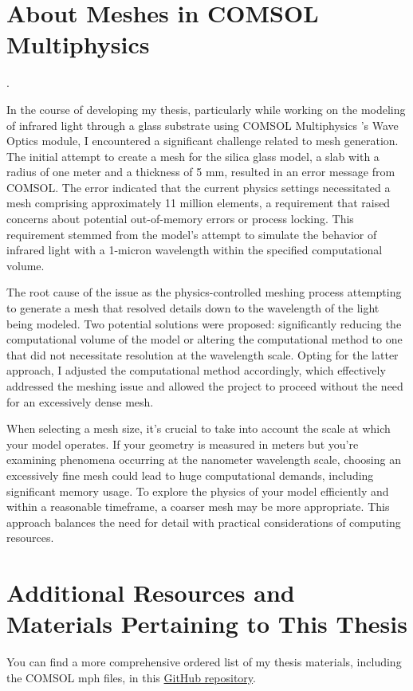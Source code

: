 \section{About Meshes in COMSOL Multiphysics}.

In the course of developing my thesis, particularly while working on the modeling of infrared light through a glass substrate using COMSOL Multiphysics \texttrademark's Wave Optics module, I encountered a significant challenge related to mesh generation. The initial attempt to create a mesh for the silica glass model, a slab with a radius of one meter and a thickness of 5 mm, resulted in an error message from COMSOL. The error indicated that the current physics settings necessitated a mesh comprising approximately 11 million elements, a requirement that raised concerns about potential out-of-memory errors or process locking. This requirement stemmed from the model's attempt to simulate the behavior of infrared light with a 1-micron wavelength within the specified computational volume.

The root cause of the issue as the physics-controlled meshing process attempting to generate a mesh that resolved details down to the wavelength of the light being modeled. Two potential solutions were proposed: significantly reducing the computational volume of the model or altering the computational method to one that did not necessitate resolution at the wavelength scale. Opting for the latter approach, I adjusted the computational method accordingly, which effectively addressed the meshing issue and allowed the project to proceed without the need for an excessively dense mesh.

When selecting a mesh size, it's crucial to take into account the scale at which your model operates. If your geometry is measured in meters but you're examining phenomena occurring at the nanometer wavelength scale, choosing an excessively fine mesh could lead to huge computational demands, including significant memory usage. To explore the physics of your model efficiently and within a reasonable timeframe, a coarser mesh may be more appropriate. This approach balances the need for detail with practical considerations of computing resources.

\section{Additional Resources and Materials Pertaining to This Thesis}

You can find a more comprehensive ordered list of my thesis materials, including the COMSOL mph files, in this \href{https://github.com/Collins-kariuk/Physics-Thesis-PDRCs.git}{GitHub repository}.

